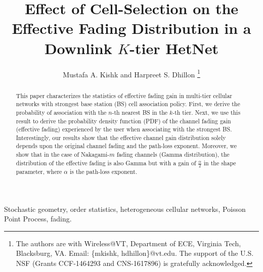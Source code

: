 \documentclass[final]{IEEEtran}
\begin{document}
\graphicspath{{./Figures/}}
\title{
Effect of Cell-Selection on the Effective Fading Distribution in a Downlink $K$-tier HetNet
}
\author{
Mustafa A. Kishk and Harpreet S. Dhillon
\thanks{The authors are with Wireless@VT, Department of ECE, Virginia Tech, Blacksburg, VA. Email: \{mkishk, hdhillon\}@vt.edu. The support of the U.S. NSF (Grants CCF-1464293 and CNS-1617896) is gratefully acknowledged.} %
\vspace{-5ex}}


\maketitle

\begin{abstract}
This paper characterizes the statistics of effective fading gain in multi-tier cellular networks with strongest base station (BS) cell association policy. First, we derive the probability of association with the $n$-th nearest BS in the $k$-th tier. Next, we use this result to derive the probability density function (PDF) of the channel fading gain (effective fading) experienced by the user when associating with the strongest BS. Interestingly, our results show that the effective channel gain distribution solely depends upon the original channel fading and the path-loss exponent. Moreover, we show that in the case of Nakagami-$m$ fading channels (Gamma distribution), the distribution of the effective fading is also Gamma but with a gain of $\frac{\alpha}{2}$ in the shape parameter, where $\alpha$ is the path-loss exponent.%
\end{abstract}
\begin{IEEEkeywords}
Stochastic geometry, order statistics, heterogeneous cellular networks, Poisson Point Process, fading.
\end{IEEEkeywords}
\vspace{-3mm}
\end{document}
